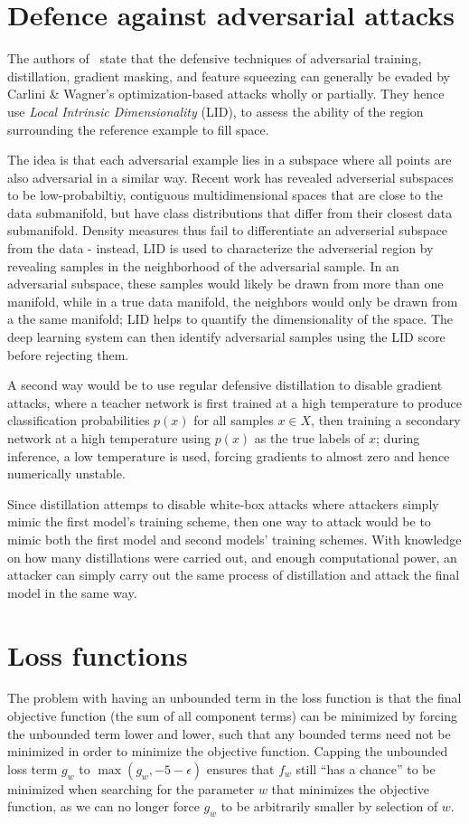 \documentclass[twocolumn, 9pt]{article}
\begin{document}
\section{Defence against adversarial attacks}
The authors of~\cite{ma2018} state that the defensive techniques of adversarial training, distillation, gradient masking, and feature squeezing can generally be evaded by Carlini \& Wagner's optimization-based attacks wholly or partially. They hence use \textit{Local Intrinsic Dimensionality} (LID), to assess the ability of the region surrounding the reference example to fill space.

The idea is that each adversarial example lies in a subspace where all points are also adversarial in a similar way. Recent work has revealed adverserial subspaces to be low-probabiltiy, contiguous multidimensional spaces that are close to the data submanifold, but have class distributions that differ from their closest data submanifold. Density measures thus fail to differentiate an adverserial subspace from the data - instead, LID is used to characterize the adverserial region by revealing samples in the neighborhood of the adversarial sample. In an adversarial subspace, these samples would likely be drawn from more than one manifold, while in a true data manifold, the neighbors would only be drawn from a the same manifold; LID helps to quantify the dimensionality of the space. The deep learning system can then identify adversarial samples using the LID score before rejecting them.

A second way would be to use regular defensive distillation to disable gradient attacks, where a teacher network is first trained at a high temperature to produce classification probabilities $p(x)$ for all samples $x\in X$, then training a secondary network at a high temperature using $p(x)$ as the true labels of $x$; during inference, a low temperature is used, forcing gradients to almost zero and hence numerically unstable.

Since distillation attemps to disable white-box attacks where attackers simply mimic the first model's training scheme, then one way to attack would be to mimic both the first model and second models' training schemes. With knowledge on how many distillations were carried out, and enough computational power, an attacker can simply carry out the same process of distillation and attack the final model in the same way.

\section{Loss functions}
The problem with having an unbounded term in the loss function is that the final objective function (the sum of all component terms) can be minimized by forcing the unbounded term lower and lower, such that any bounded terms need not be minimized in order to minimize the objective function. Capping the unbounded loss term $g_w$ to $\max (g_w, -5-\epsilon)$ ensures that $f_w$ still ``has a chance'' to be minimized when searching for the parameter $w$ that minimizes the objective function, as we can no longer force $g_w$ to be arbitrarily smaller by selection of $w$.
\end{document}
